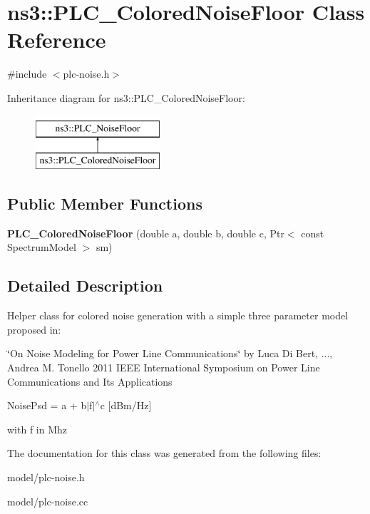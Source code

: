 \hypertarget{classns3_1_1PLC__ColoredNoiseFloor}{\section{ns3\-:\-:\-P\-L\-C\-\_\-\-Colored\-Noise\-Floor \-Class \-Reference}
\label{classns3_1_1PLC__ColoredNoiseFloor}
}


{\ttfamily \#include $<$plc-\/noise.\-h$>$}

\-Inheritance diagram for ns3\-:\-:\-P\-L\-C\-\_\-\-Colored\-Noise\-Floor\-:\begin{figure}[H]
\begin{center}
\leavevmode
\includegraphics[height=2.000000cm]{classns3_1_1PLC__ColoredNoiseFloor}
\end{center}
\end{figure}
\subsection*{\-Public \-Member \-Functions}
\begin{DoxyCompactItemize}
\item 
\hypertarget{classns3_1_1PLC__ColoredNoiseFloor_ab858fcfc40d2125f8689445ede999b30}{{\bfseries \-P\-L\-C\-\_\-\-Colored\-Noise\-Floor} (double a, double b, double c, \-Ptr$<$ const \-Spectrum\-Model $>$ sm)}\label{classns3_1_1PLC__ColoredNoiseFloor_ab858fcfc40d2125f8689445ede999b30}

\end{DoxyCompactItemize}


\subsection{\-Detailed \-Description}
\-Helper class for colored noise generation with a simple three parameter model proposed in\-:

\char`\"{}\-On Noise Modeling for Power Line Communications\char`\"{} by \-Luca \-Di \-Bert, ..., \-Andrea \-M. \-Tonello 2011 \-I\-E\-E\-E \-International \-Symposium on \-Power \-Line \-Communications and \-Its \-Applications

\-Noise\-Psd = a + b$|$f$|$$^\wedge$c \mbox{[}d\-Bm/\-Hz\mbox{]}

with f in \-Mhz 

\-The documentation for this class was generated from the following files\-:\begin{DoxyCompactItemize}
\item 
model/plc-\/noise.\-h\item 
model/plc-\/noise.\-cc\end{DoxyCompactItemize}

